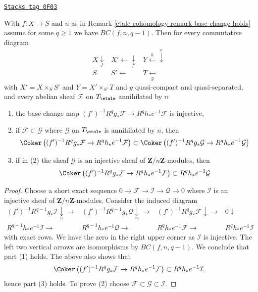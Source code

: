 \begin{lemma}
\label{etale-cohomology-lemma-base-change-q-injective}
\href{https://stacks.math.columbia.edu/tag/0F03}{\texttt{Stacks tag 0F03}}

With $f : X \to S$ and $n$ as in Remark \ref{etale-cohomology-remark-base-change-holds}
assume for some $q \geq 1$ we have $BC(f, n, q - 1)$. Then
for every commutative diagram
$$
\begin{array}{ccc}X \underset{f}{\downarrow} & X' \longleftarrow\underset{f'}{\downarrow} & Y \overset{h}{\longleftarrow}\overset{e}{\downarrow} \\ S & S' \longleftarrow & T \underset{g}{\longleftarrow}\end{array}
$$
with $X' = X \times_S S'$ and $Y = X' \times_{S'} T$ and
$g$ quasi-compact and quasi-separated, and every abelian sheaf
$\mathcal{F}$ on $T_\etale$ annihilated by $n$
\begin{enumerate}
\item the base change map
$(f')^{-1}R^qg_*\mathcal{F}\to R^qh_*e^{-1}\mathcal{F}$
is injective,
\item if $\mathcal{F} \subset \mathcal{G}$ where $\mathcal{G}$
on $T_\etale$ is annihilated by $n$, then
$$
\Coker\left(
(f')^{-1}R^qg_*\mathcal{F}\to R^qh_*e^{-1}\mathcal{F}
\right)
\subset
\Coker\left(
(f')^{-1}R^qg_*\mathcal{G}\to R^qh_*e^{-1}\mathcal{G}
\right)
$$
\item if in (2) the sheaf $\mathcal{G}$ is an injective sheaf
of $\mathbf{Z}/n\mathbf{Z}$-modules, then
$$
\Coker\left((f')^{-1}R^qg_*\mathcal{F}\to R^qh_*e^{-1}\mathcal{F} \right)
\subset R^qh_*e^{-1}\mathcal{G}
$$
\end{enumerate}
\end{lemma}

\begin{proof}
Choose a short exact sequence
$0 \to \mathcal{F} \to \mathcal{I} \to \mathcal{Q} \to 0$
where $\mathcal{I}$ is an injective sheaf of $\mathbf{Z}/n\mathbf{Z}$-modules.
Consider the induced diagram
$$
\begin{array}{cccc}(f')^{-1}R^{q - 1}g_*\mathcal{I} \underset{\cong}{\downarrow}\longrightarrow & (f')^{-1}R^{q - 1}g_*\mathcal{Q} \underset{\cong}{\downarrow}\longrightarrow & (f')^{-1}R^qg_*\mathcal{F} \downarrow\longrightarrow & 0 \downarrow \\ R^{q - 1}h_*e^{-1}\mathcal{I} \longrightarrow & R^{q - 1}h_*e^{-1}\mathcal{Q} \longrightarrow & R^qh_*e^{-1}\mathcal{F} \longrightarrow & R^qh_*e^{-1}\mathcal{I}\end{array}
$$
with exact rows. We have the zero in the right upper corner
as $\mathcal{I}$ is injective. The left two vertical arrows are
isomorphisms by $BC(f, n, q - 1)$. We conclude that part (1) holds.
The above also shows that
$$
\Coker\left(
(f')^{-1}R^qg_*\mathcal{F}\to R^qh_*e^{-1}\mathcal{F}
\right)
\subset
R^qh_*e^{-1}\mathcal{I}
$$
hence part (3) holds. To prove (2) choose
$\mathcal{F} \subset \mathcal{G} \subset \mathcal{I}$.
\end{proof}

